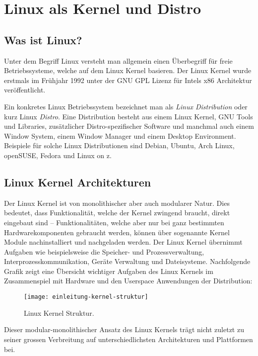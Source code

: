 \chapter{Linux als Kernel und Distro}
\label{cha:Linux}

\section{Was ist Linux?}

Unter dem Begriff Linux versteht man allgemein einen Überbegriff für freie Betriebssysteme, welche auf dem Linux Kernel basieren.\cite{LinuxWiki}
Der Linux Kernel wurde erstmals im Frühjahr 1992 unter der GNU GPL Lizenz für Intels x86 Architektur veröffentlicht.

Ein konkretes Linux Betriebssystem bezeichnet man als \textit{Linux Distribution} oder kurz Linux \textit{Distro}.
Eine Distribution besteht aus einem Linux Kernel, GNU Tools und Libraries, zusätzlicher Distro-spezifischer Software und manchmal auch einem Window System, einem Window Manager und einem Desktop Environment. Beispiele für solche Linux Distributionen sind Debian, Ubuntu, Arch Linux, openSUSE, Fedora und Linux on z.\cite{LinuxDistroWiki}

\section{Linux Kernel Architekturen}

Der Linux Kernel ist von monolithischer aber auch modularer Natur. Dies bedeutet, dass Funktionalität, welche der Kernel zwingend braucht, direkt eingebaut sind -- Funktionalitäten, welche aber nur bei ganz bestimmten Hardwarekomponenten gebraucht werden, können über sogenannte Kernel Module nachinstalliert und nachgeladen werden.
Der Linux Kernel übernimmt Aufgaben wie beispielsweise die Speicher- und Prozessverwaltung, Interprozesskommunikation, Geräte Verwaltung und Dateisysteme.
Nachfolgende Grafik zeigt eine Übersicht wichtiger Aufgaben des Linux Kernels im Zusammenspiel mit Hardware und den Userspace Anwendungen der Distribution:

\begin{figure}[h!]
\centering
\texttt{[image: einleitung-kernel-struktur]}
\caption{Linux Kernel Struktur\cite{KernelStruktur}.}
\label{fig:KernelStruktur}
\end{figure}

\newpage

Dieser modular-monolithischer Ansatz des Linux Kernels trägt nicht zuletzt zu seiner grossen Verbreitung auf unterschiedlichsten Architekturen und Plattformen bei.

